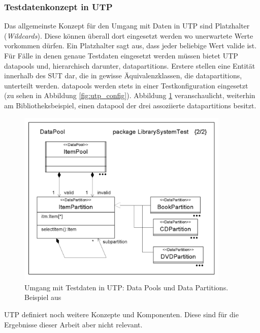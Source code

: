 \subsubsection{Testdatenkonzept in UTP}
\label{sec:utp_datapools}
Das allgemeinste Konzept für den Umgang mit Daten in \Gls{UTP} sind Platzhalter (\textit{Wildcards}). Diese können überall dort eingesetzt werden wo unerwartete Werte vorkommen dürfen. Ein Platzhalter sagt aus, dass jeder beliebige Wert valide ist.\\
Für Fälle in denen genaue Testdaten eingesetzt werden müssen bietet \Gls{UTP} \glspl{datapool} und, hierarchisch darunter, \glspl{datapartition}. Erstere stellen eine Entität innerhalb des \Gls{SUT} dar, die in gewisse Äquivalenzklassen, die \glspl{datapartition}, unterteilt werden. \glspl{datapool} werden stets in einer Testkonfiguration eingesetzt (zu sehen in Abbildung \ref{fig:utp_config}). Abbildung \ref{fig:utp_pool} veranschaulicht, weiterhin am Bibliotheksbeispiel, einen \Gls{datapool} der drei assoziierte \glspl{datapartition} besitzt.

\begin{figure}[h] 
  \centering
     \includegraphics[width=0.9\textwidth]{figures/utp_pool.png}
  \caption{Umgang mit Testdaten in UTP: Data Pools und Data Partitions. Beispiel aus  \cite{_model-driven_2007}}
  \label{fig:utp_pool}
\end{figure}

\Gls{UTP} definiert noch weitere Konzepte und Komponenten. Diese sind für die Ergebnisse dieser Arbeit aber nicht relevant.

